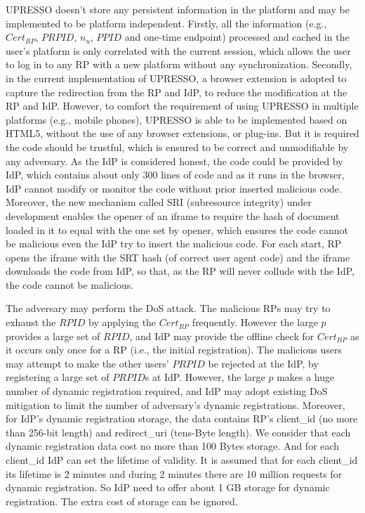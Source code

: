  UPRESSO doesn't store any persistent information in the platform and may be implemented to be platform independent. Firstly, all the information (e.g., $Cert_{RP}$, $PRPID$, $n_u$, $PPID$ and one-time endpoint) processed and cached in the user's platform is only correlated with the current session, which allows the user to log in to any RP with a new platform without any synchronization. Secondly, in the current implementation of UPRESSO, a browser extension is adopted to capture the redirection from the RP and IdP, to reduce the modification at the RP and IdP.
However, to comfort the requirement of using UPRESSO in multiple platforms (e.g., mobile phones), UPRESSO is able to be implemented based on HTML5, without the use of any browser extensions, or plug-ins. But it is required the code should be trustful, which is ensured to be correct and unmodifiable by any adversary. As the IdP is considered honest, the code could be provided by IdP, which contains about only 300 lines of code and as it runs in the browser, IdP cannot modify or monitor the code without prior inserted malicious code. Moreover, the new mechanism called SRI (subresource integrity) under development enables the opener of an iframe to require the hash of document loaded in it to equal with the one set by opener, which ensures the code cannot be malicious even the IdP try to insert the malicious code. For each start, RP opens the iframe with the SRT hash (of correct user agent code) and the iframe downloads the code from IdP, so that, as the RP will never collude with the IdP, the code cannot be malicious.

 The adversary may perform the DoS attack. The malicious RPs may try to exhaust the $RPID$  by applying the $Cert_{RP}$ frequently. However the large $p$ provides a large set of $RPID$, and IdP may provide the offline check for $Cert_{RP}$ as it occurs only once for a RP (i.e., the initial registration). The malicious users may attempt to make the other users' $PRPID$ be rejected at the IdP, by registering a large set of $PRPID$s at IdP. However, the large $p$ makes a huge number of dynamic registration required, and IdP may adopt existing DoS mitigation to limit the number of adversary's dynamic registrations. Moreover, for IdP's dynamic registration storage, the data contains RP's client\_id (no more than 256-bit length) and redirect\_uri (tens-Byte length). We consider that each dynamic registration data cost no more than 100 Bytes storage. And for each client\_id IdP can set the lifetime of validity. It is assumed that for each client\_id its lifetime is 2 minutes and during 2 minutes there are 10 million requests for dynamic registration. So IdP need to offer about 1 GB storage for dynamic registration. The extra cost of storage can be ignored.




